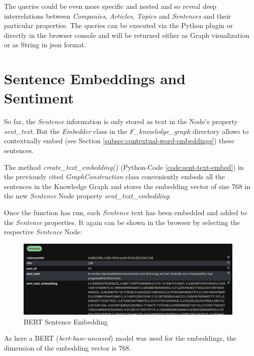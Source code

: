 The queries could be even more specific and nested and so reveal deep interrelations between \emph{Companies}, \emph{Articles}, \emph{Topics} and \emph{Sentences} and their particular properties.
The queries can be executed via the Python plugin or directly in the browser console and will be returned either as Graph visualization or as String in \gls{json} format.

\section{Sentence Embeddings and Sentiment}
So far, the \emph{Sentence} information is only stored as text in the Node's property \emph{sent\_text}.
But the \emph{Embedder} class in the \emph{F\_knowledge\_graph} directory allows to contextually embed (see Section \ref{subsec:contextual-word-embeddings}) these sentences.

The method \emph{create\_text\_embedding()} (Python-Code \ref{code:sent-text-embed}) in the previously cited \emph{GraphConstruction} class conveniently embeds all the sentences in the Knowledge Graph and
stores the embedding vector of size 768 in the new \emph{Sentence} Node property \emph{sent\_text\_embedding}:

Once the function has run, each \emph{Sentence} text has been embedded and added to the \emph{Sentence} properties.
It again can be shown in the browser by selecting the respective \emph{Sentence} Node:

\begin{figure}[H]   %
    \centering
    \includegraphics[width=\textwidth]{Assets/sent-embed}
    \caption{BERT Sentence Embedding}
    \label{fig:sent-embed}
\end{figure}
As here a \gls{BERT} (\emph{bert-base-uncased}) model was used for the embeddings, the dimension of the embedding vector is 768.\\

